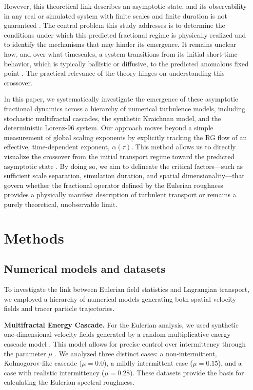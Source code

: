 \documentclass[]{article}
\begin{document}
However, this theoretical link describes an asymptotic state, and its observability in any real or simulated system with finite scales and finite duration is not guaranteed \citep{onizawa2026finitetimeobservabilityoscillatoryinstabilities}. The central problem this study addresses is to determine the conditions under which this predicted fractional regime is physically realized and to identify the mechanisms that may hinder its emergence. It remains unclear how, and over what timescales, a system transitions from its initial short-time behavior, which is typically ballistic or diffusive, to the predicted anomalous fixed point \citep{onizawa2026finitetimeobservabilityoscillatoryinstabilities}. The practical relevance of the theory hinges on understanding this crossover.

In this paper, we systematically investigate the emergence of these asymptotic fractional dynamics \citep{edelman2022cyclesasymptoticallystablechaotic} across a hierarchy of numerical turbulence models, including stochastic multifractal cascades, the synthetic Kraichnan model, and the deterministic Lorenz-96 system. Our approach moves beyond a simple measurement of global scaling exponents by explicitly tracking the RG flow of an effective, time-dependent exponent, $\alpha(\tau)$. This method allows us to directly visualize the crossover from the initial transport regime toward the predicted asymptotic state \citep{majdoub2025longtimeasymptoticssubordinatedfractional}. By doing so, we aim to delineate the critical factors—such as sufficient scale separation, simulation duration, and spatial dimensionality—that govern whether the fractional operator defined by the Eulerian roughness provides a physically manifest description of turbulent transport or remains a purely theoretical, unobservable limit.

\section{Methods}
\label{sec:methods}
\subsection{Numerical models and datasets}
To investigate the link between Eulerian field statistics and Lagrangian transport, we employed a hierarchy of numerical models generating both spatial velocity fields and tracer particle trajectories.

\noindent\textbf{Multifractal Energy Cascade.} For the Eulerian analysis, we used synthetic one-dimensional velocity fields generated by a random multiplicative energy cascade model \citep{shivamoggi2022generalizedfractaldimensiondissipative}. This model allows for precise control over intermittency through the parameter $\mu$ \citep{arreola2024currentstateatmosphericturbulence}. We analyzed three distinct cases: a non-intermittent, Kolmogorov-like cascade ($\mu=0.0$), a mildly intermittent case ($\mu=0.15$), and a case with realistic intermittency ($\mu=0.28$). These datasets provide the basis for calculating the Eulerian spectral roughness.
\end{document}
